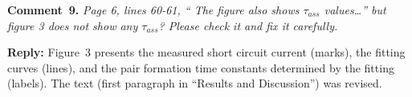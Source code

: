 \documentclass[sn-mathphys]{sn-jnl}
\begin{document}
\vspace{1cm}
\noindent
\textcolor[rgb]{0.00,0.50,1.00}{\textbf{Comment~9.}}
\emph{Page 6, lines 60-61, “ The figure also shows $\tau_{ass}$ values…” but figure 3 does not show any $\tau_{ass}$?
Please check it and fix it carefully.}

\noindent
\textcolor[rgb]{0.51,0.00,0.00}{\textbf{Reply:}}
Figure~3 presents the measured short circuit current (marks), the fitting curves (lines), and the pair formation time constants
determined by the fitting (labels).
The text (first paragraph in ``Results and Discussion'') was revised.




\end{document}
